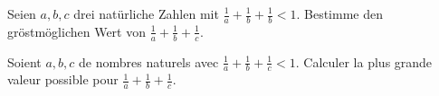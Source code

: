 Seien $a,b,c$ drei natürliche Zahlen mit $\frac{1}{a}+\frac{1}{b}+\frac{1}{b}<1$. Bestimme den gröstmöglichen Wert von $\frac{1}{a} + \frac{1}{b}+\frac{1}{c}$.

\bigskip

Soient $a,b,c$ de nombres naturels avec $\frac{1}{a} +\frac{1}{b}+\frac{1}{c} < 1$. Calculer la plus grande valeur possible pour $\frac{1}{a}+\frac{1}{b}+\frac{1}{c}$.